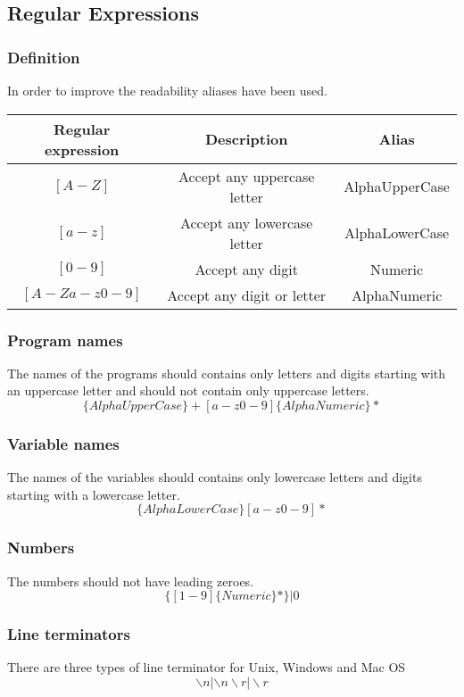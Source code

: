 \documentclass{article}
\begin{document}
\subsection{Regular Expressions}
\subsubsection{Definition}
In order to improve the readability aliases have been used.
\begin{center}
\begin{tabular}{ |c|c|c| }
 \hline
 Regular expression & Description & Alias \\
 \hline
 $[A-Z]$ & Accept any uppercase letter & AlphaUpperCase \\
 $[a-z]$ & Accept any lowercase letter & AlphaLowerCase \\
 $[0-9]$ & Accept any digit & Numeric \\
 $[A-Z a-z0-9]$ & Accept any digit or letter & AlphaNumeric \\
 \hline
\end{tabular}
\end{center}
\subsubsection{Program names}
The names of the programs should contains only letters and digits starting with an uppercase letter and should not contain only uppercase letters.
$$\{AlphaUpperCase\} + [a-z0-9] \{AlphaNumeric\}*$$

\subsubsection{Variable names}
The names of the variables should contains only lowercase letters and digits starting with a lowercase letter.
$$\{AlphaLowerCase\} [a-z0-9]*$$

\subsubsection{Numbers}
The numbers should not have leading zeroes.
$$\{[1-9] \{Numeric\}*\} | 0$$

\subsubsection{Line terminators}
There are three types of line terminator for Unix, Windows and Mac OS
$$\backslash n | \backslash n\backslash r | \backslash r$$
\end{document}
